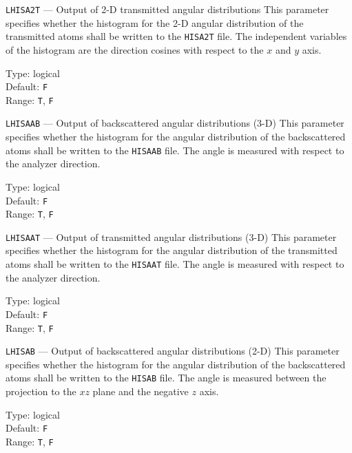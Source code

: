 \begin{keydescription}{\texttt{LHISA2T} --- Output of 2-D transmitted angular distributions}
%
  This parameter specifies whether the histogram for the 2-D angular
  distribution of the transmitted atoms shall be written to the
  \texttt{HISA2T} file. The independent variables of the histogram are the
  direction cosines with respect to the $x$ and $y$ axis.
  \begin{keytab}
    Type:    \> logical \\
    Default: \> \texttt{F} \\
    Range:   \> \texttt{T}, \texttt{F} 
  \end{keytab}
\end{keydescription}

\begin{keydescription}{\texttt{LHISAAB} --- Output of backscattered angular distributions (3-D)}
%
  This parameter specifies whether the histogram for the angular distribution of the 
  backscattered atoms shall be written to the \texttt{HISAAB} file. The angle is measured
  with respect to the analyzer direction.
  \begin{keytab}
    Type:    \> logical \\
    Default: \> \texttt{F} \\
    Range:   \> \texttt{T}, \texttt{F} 
  \end{keytab}
\end{keydescription}

\begin{keydescription}{\texttt{LHISAAT} --- Output of transmitted angular distributions (3-D)}
%
  This parameter specifies whether the histogram for the angular distribution of the 
  transmitted atoms shall be written to the \texttt{HISAAT} file. The angle is measured
  with respect to the analyzer direction.
  \begin{keytab}
    Type:    \> logical \\
    Default: \> \texttt{F} \\
    Range:   \> \texttt{T}, \texttt{F} 
  \end{keytab}
\end{keydescription}

\begin{keydescription}{\texttt{LHISAB} --- Output of backscattered angular distributions (2-D)}
%
  This parameter specifies whether the histogram for the angular distribution of the 
  backscattered atoms shall be written to the \texttt{HISAB} file. The angle is measured
  between the projection to the $xz$ plane and the negative $z$ axis.
  \begin{keytab}
    Type:    \> logical \\
    Default: \> \texttt{F} \\
    Range:   \> \texttt{T}, \texttt{F} 
  \end{keytab}
\end{keydescription}

